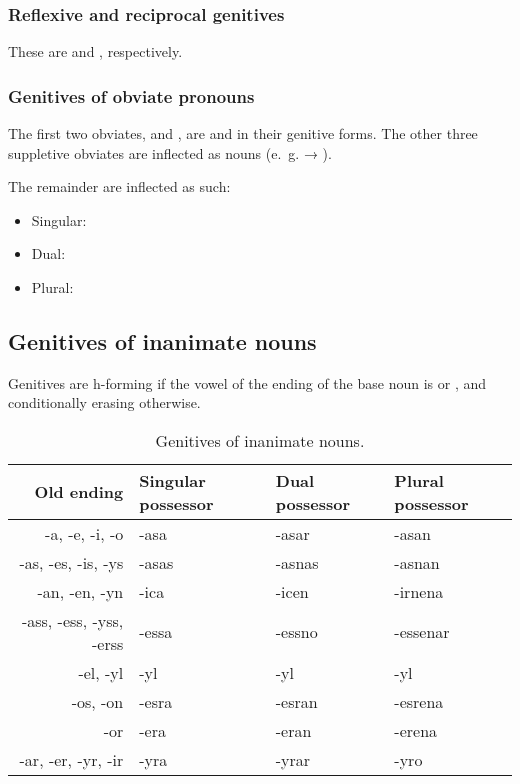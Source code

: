 \documentclass{book}
\begin{document}
\subsubsection{Reflexive and reciprocal genitives}

These are  and , respectively.

\subsubsection{Genitives of obviate pronouns}

The first two obviates,  and , are  and  in their genitive forms.  The other three suppletive obviates are inflected as nouns (e.~g.  → ).

The remainder are inflected as such:

\begin{itemize}
	\item Singular: 
	\item Dual: 
	\item Plural: 
\end{itemize}

\subsection{Genitives of inanimate nouns}

Genitives are h-forming if the vowel of the ending of the base noun is  or , and conditionally erasing otherwise.

\begin{table}[h]
  \caption{Genitives of inanimate nouns.}
  \centering
  \begin{tabular}{|r|l|l|l|}
    \hline
    Old ending & Singular possessor & Dual possessor & Plural possessor \\ \hline
    -a, -e, -i, -o & -asa & -asar & -asan \\
    -as, -es, -is, -ys & -asas & -asnas & -asnan \\
    -an, -en, -yn & -ica & -icen & -irnena \\
    -ass, -ess, -yss, -erss & -essa & -essno & -essenar \\
    -el, -yl & -yl & -yl & -yl \\
    -os, -on & -esra & -esran & -esrena \\
    -or & -era & -eran & -erena \\
    -ar, -er, -yr, -ir & -yra & -yrar & -yro \\ \hline
  \end{tabular}
\end{table}
\end{document}

